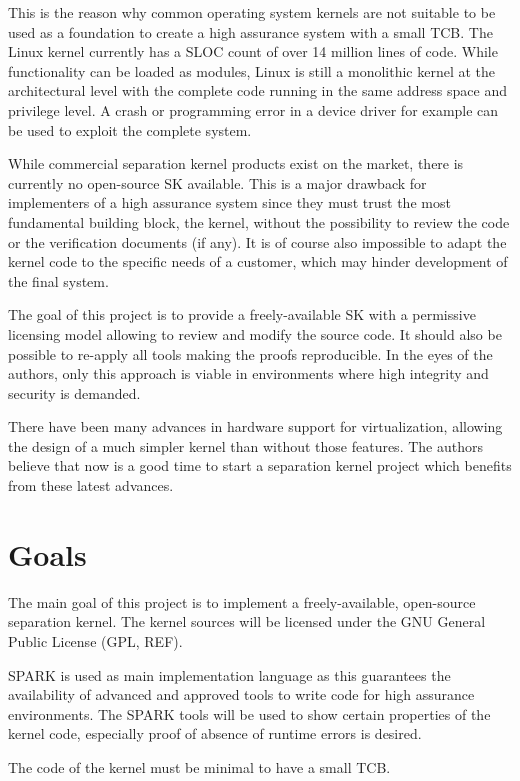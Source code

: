 This is the reason why common operating system kernels are not suitable to be
used as a foundation to create a high assurance system with a small TCB. The
Linux kernel currently has a SLOC count of over 14 million lines
of code. While functionality can be loaded as modules, Linux is still a
monolithic kernel at the architectural level with the complete code running in
the same address space and privilege level. A crash or programming error in a
device driver for example can be used to exploit the complete system.

While commercial separation kernel products exist on the market, there is
currently no open-source SK available. This is a major drawback for
implementers of a high assurance system since they must trust the most
fundamental building block, the kernel, without the possibility to review the
code or the verification documents (if any). It is of course also impossible to
adapt the kernel code to the specific needs of a customer, which may hinder
development of the final system.

The goal of this project is to provide a freely-available SK with a permissive
licensing model allowing to review and modify the source code.
It should also be possible to re-apply all tools making the proofs
reproducible. In the eyes of the authors, only this approach is viable in
environments where high integrity and security is demanded.

There have been many advances in hardware support for virtualization, allowing
the design of a much simpler kernel than without those features. The authors
believe that now is a good time to start a separation kernel project which
benefits from these latest advances.

\section{Goals}
The main goal of this project is to implement a freely-available, open-source
separation kernel. The kernel sources will be licensed under the GNU General
Public License (GPL, REF).

SPARK is used as main implementation language as this guarantees the
availability of advanced and approved tools to write code for high assurance
environments. The SPARK tools will be used to show certain properties of the
kernel code, especially proof of absence of runtime errors is desired.

The code of the kernel must be minimal to have a small TCB.

